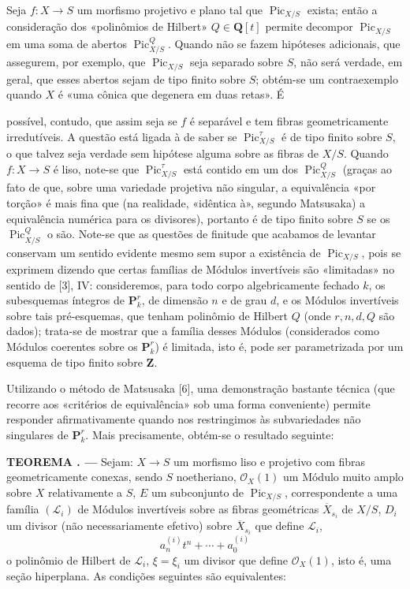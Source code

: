 \documentclass[11pt,twoside,openany]{book}
\numberwithin{equation}{section}
\newcommand{\src}[1]{%
  \phantomsection\hypertarget{src:#1}{}%
  \marginpar{\raggedleft\footnotesize\sffamily #1}%
}
\theoremstyle{plain}
\theoremstyle{definition}
\theoremstyle{remark}
\newcommand{\result}[2]{%
  \par\medskip\noindent\textbf{#1%
  \if\relax\detokenize{#2}\relax\else\space#2\fi. ---}\enspace
}
\newcommand{\FgaUnitKey}{frontmatter}
\renewcommand{\src}[1]{%
  \phantomsection\hypertarget{src:\FgaUnitKey:#1}{}%
  \marginpar{\raggedleft\footnotesize\sffamily #1}%
}
\begin{document}
Seja $f:X\longrightarrow S$ um morfismo projetivo e plano tal que
$\operatorname{Pic}_{X/S}$ exista; então a consideração dos «polinômios de
Hilbert» $Q\in\mathbf Q[t]$ permite decompor $\operatorname{Pic}_{X/S}$ em uma
soma de abertos $\operatorname{Pic}_{X/S}^Q$. Quando não se fazem hipóteses
adicionais, que assegurem, por exemplo, que $\operatorname{Pic}_{X/S}$ seja
separado sobre $S$, não será verdade, em geral, que esses abertos sejam de tipo
finito sobre $S$; obtém-se um contraexemplo quando $X$ é «uma cônica que
degenera em duas retas». É
\src{242}
possível, contudo, que assim seja se $f$ é separável e tem fibras
geometricamente irredutíveis. A questão está ligada à de saber se
$\operatorname{Pic}_{X/S}^\tau$ é de tipo finito sobre $S$, o que talvez seja
verdade sem hipótese alguma sobre as fibras de $X/S$. Quando
$f:X\longrightarrow S$ é liso, note-se que
$\operatorname{Pic}_{X/S}^\tau$ está contido em um dos
$\operatorname{Pic}_{X/S}^Q$ (graças ao fato de que, sobre uma variedade
projetiva não singular, a equivalência «por torção» é mais fina que (na
realidade, «idêntica à», segundo Matsusaka) a equivalência numérica para os
divisores), portanto é de tipo finito sobre $S$ se os
$\operatorname{Pic}_{X/S}^Q$ o são. Note-se que as questões de finitude que
acabamos de levantar conservam um sentido evidente mesmo sem supor a existência
de $\operatorname{Pic}_{X/S}$, pois se exprimem dizendo que certas famílias de
Módulos invertíveis são «limitadas» no sentido de [3], IV: consideremos, para
todo corpo algebricamente fechado $k$, os subesquemas íntegros de
$\mathbf P_k^r$, de dimensão $n$ e de grau $d$, e os Módulos invertíveis sobre
tais pré-esquemas, que tenham polinômio de Hilbert $Q$ (onde $r,n,d,Q$ são
dados); trata-se de mostrar que a família desses Módulos (considerados como
Módulos coerentes sobre os $\mathbf P_k^r$) é limitada, isto é, pode ser
parametrizada por um esquema de tipo finito sobre $\mathbf Z$.

Utilizando o método de Matsusaka [6], uma demonstração bastante técnica (que
recorre aos «critérios de equivalência» sob uma forma conveniente) permite
responder afirmativamente quando nos restringimos às subvariedades não
singulares de $\mathbf P_k^r$. Mais precisamente, obtém-se o resultado seguinte:

\result{TEOREMA}{4.1} Sejam: $X\longrightarrow S$ um
morfismo liso e projetivo com fibras geometricamente conexas, sendo $S$
noetheriano, $\mathcal O_X(1)$ um Módulo muito amplo sobre $X$ relativamente a
$S$, $E$ um subconjunto de $\operatorname{Pic}_{X/S}$, correspondente a uma
família $(\mathcal L_i)$ de Módulos invertíveis sobre as fibras geométricas
$\overline X_{s_i}$ de $X/S$, $D_i$ um divisor (não necessariamente efetivo)
sobre $\overline X_{s_i}$ que define $\mathcal L_i$,
\[
a_n^{(i)}t^n+\cdots+a_0^{(i)}
\]
o polinômio de Hilbert de $\mathcal L_i$, $\xi=\xi_i$ um divisor que define
$\mathcal O_X(1)$, isto é, uma seção hiperplana. As condições seguintes são
equivalentes:
\end{document}
